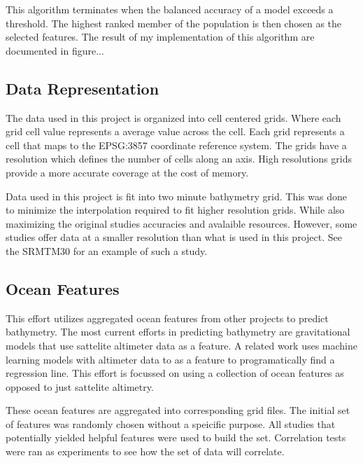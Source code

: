 \par
This algorithm terminates when the balanced accuracy of a model exceeds a threshold.
The highest ranked member of the population is then chosen as the selected features.
The result of my implementation of this algorithm are documented in figure...

\subsection{Data Representation}
The data used in this project is organized into cell centered grids.
Where each grid cell value represents a average value across the cell.
Each grid represents a cell that maps to the EPSG:3857 coordinate reference system.
The grids have a resolution which defines the number of cells along an axis.
High resolutions grids provide a more accurate coverage at the cost of memory.

\par
Data used in this project is fit into two minute bathymetry grid. 
This was done to minimize the interpolation required to fit higher resolution grids.
While also maximizing the original studies accuracies and avalaible resources.
However, some studies offer data at a smaller resolution than what is used in this project.
See the SRMTM30 \cite{becker2009global} for an example of such a study.

\subsection{Ocean Features}
This effort utilizes aggregated ocean features from other projects to predict bathymetry.
The most current efforts in predicting bathymetry are gravitational models that use sattelite altimeter data as a feature.
A related work \cite{jena2012prediction} uses machine learning models with altimeter data to as a feature to programatically find a regression line.
This effort is focussed on using a collection of ocean features as opposed to just sattelite altimetry.

\par
These ocean features are aggregated into corresponding grid files.
The initial set of features was randomly chosen without a speicific purpose.
All studies that potentially yielded helpful features were used to build the set.
Correlation tests were ran as experiments to see how the set of data will correlate.

